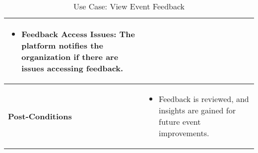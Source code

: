 \begin{table}[!ht]
\begin{tabularx}{\textwidth}{|l|X|}
\begin{itemize}[label=--,itemsep=0pt]
            \item Feedback Access Issues: The platform notifies the organization if there are issues accessing feedback.
        \end{itemize} \\
        \hline
        \textbf{Post-Conditions} & 
        \begin{itemize}[label=--,itemsep=0pt]
            \item Feedback is reviewed, and insights are gained for future event improvements.
        \end{itemize} \\
        \hline
    \end{tabularx}
    \caption{Use Case: View Event Feedback}
    \label{tab:use-case-view-event-feedback}
\end{table}


